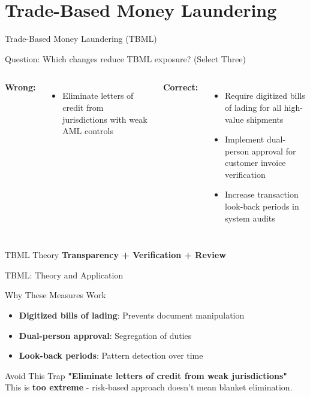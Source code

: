 \documentclass{beamer}
\begin{document}
\section{Trade-Based Money Laundering}
\begin{frame}{Trade-Based Money Laundering (TBML)}
\begin{block}{Question: Which changes reduce TBML exposure? (Select Three)}
\end{block}

\begin{columns}
\textcolor{wrong}{\textbf{ Wrong:}}
\begin{itemize}
    \item Eliminate letters of credit from jurisdictions with weak AML controls
\end{itemize}

\textcolor{correct}{\textbf{Correct:}}
\begin{itemize}
    \item Require digitized bills of lading for all high-value shipments
    \item Implement dual-person approval for customer invoice verification
    \item Increase transaction look-back periods in system audits
\end{itemize}
\end{columns}

\begin{block}{TBML Theory}
\textbf{Transparency + Verification + Review}
\end{block}
\end{frame}

\begin{frame}{TBML: Theory and Application}
\begin{block}{Why These Measures Work}
\begin{itemize}
    \item \textbf{Digitized bills of lading}: Prevents document manipulation
    \item \textbf{Dual-person approval}: Segregation of duties
    \item \textbf{Look-back periods}: Pattern detection over time
\end{itemize}
\end{block}

\begin{alertblock}{Avoid This Trap}
\textbf{"Eliminate letters of credit from weak jurisdictions"} \\
This is \textbf{too extreme} - risk-based approach doesn't mean blanket elimination.
\end{alertblock}
\end{frame}
\end{document}
